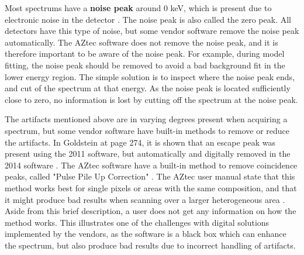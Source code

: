 



Most spectrums have a \textbf{noise peak} around 0 keV, which is present due to electronic noise in the detector \cite{aztec_manual}.
The noise peak is also called the zero peak.
All detectors have this type of noise, but some vendor software remove the noise peak automatically.
The AZtec software does not remove the noise peak, and it is therefore important to be aware of the noise peak.
For example, during model fitting, the noise peak should be removed to avoid a bad background fit in the lower energy region.
The simple solution is to inspect where the noise peak ends, and cut of the spectrum at that energy.
As the noise peak is located sufficiently close to zero, no information is lost by cutting off the spectrum at the noise peak.



The artifacts mentioned above are in varying degrees present when acquiring a spectrum, but some vendor software have built-in methods to remove or reduce the artifacts.
In Goldstein at page 274, it is shown that an escape peak was present using the 2011 software, but automatically and digitally removed in the 2014 software \cite[Fig. 18.7]{goldstein_scanning_2018}.
The AZtec software have a built-in method to remove coincidence peaks, called "Pulse Pile Up Correction" \cite{aztec_manual}.
The AZtec user manual state that this method works best for single pixels or areas with the same composition, and that it might produce bad results when scanning over a larger heterogeneous area \cite[p. 99]{aztec_manual}.
Aside from this brief description, a user does not get any information on how the method works.
This illustrates one of the challenges with digital solutions implemented by the vendors, as the software is a black box which can enhance the spectrum, but also produce bad results due to incorrect handling of artifacts. %


